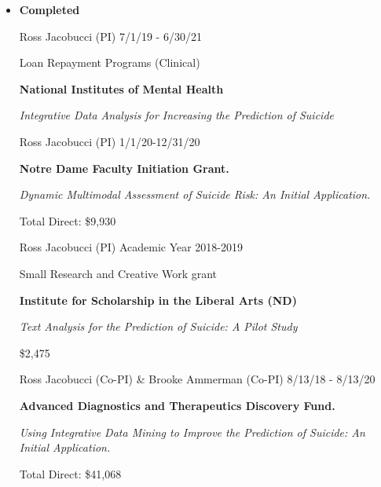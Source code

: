 \documentclass[letterpaper,10pt]{article}
\begin{document}
\begin{itemize} 
	\setlength{\topsep}{0pt}%
	\setlength{\leftmargin}{0.1in}%
	\setlength{\listparindent}{-0.1in}%
	\setlength{\itemindent}{-0.2in}%
	\setlength{\parsep}{\parskip}%
	




	\item{\textbf{\large{Completed}}}
	
		\begin{center}
		\parbox{6.5in}{{Ross Jacobucci (PI) }   \hspace{9cm} 7/1/19 - 6/30/21}
		\parbox{6.5in}{Loan Repayment Programs (Clinical)}
		\parbox{6.5in}{\textbf{National Institutes of Mental Health} }
		\parbox{6.5in}{\textit{Integrative Data Analysis for Increasing the Prediction of Suicide}}
	\end{center}
	
		\begin{center}
		\parbox{6.5in}{{Ross Jacobucci (PI)}   \hspace{9.2cm} 1/1/20-12/31/20}
		\parbox{6.5in}{\textbf{Notre Dame Faculty Initiation Grant.} }
		\parbox{6.5in}{\textit{Dynamic Multimodal Assessment of Suicide Risk: An Initial Application.}}
		\parbox{6.5in}{Total Direct: \$9,930}
	\end{center}
	
		\begin{center}
		\parbox{6.5in}{{Ross Jacobucci (PI) }   \hspace{9cm} Academic Year 2018-2019}
		\parbox{6.5in}{Small Research and Creative Work grant}
		\parbox{6.5in}{\textbf{Institute for Scholarship in the Liberal Arts (ND)} }
		\parbox{6.5in}{\textit{Text Analysis for the Prediction of Suicide: A Pilot Study}}
		\parbox{6.5in}{\$2,475}
	\end{center}
	
	\begin{center}
		\parbox{6.5in}{{Ross Jacobucci (Co-PI) \& Brooke Ammerman (Co-PI)}   \hspace{3.8cm} 8/13/18 - 8/13/20}
		\parbox{6.5in}{\textbf{Advanced Diagnostics and Therapeutics Discovery Fund.} }
		\parbox{6.5in}{\textit{Using Integrative Data Mining to Improve the Prediction of Suicide: An Initial Application.}}
		\parbox{6.5in}{Total Direct: \$41,068}
	\end{center}

	
\end{itemize}
\end{document}
